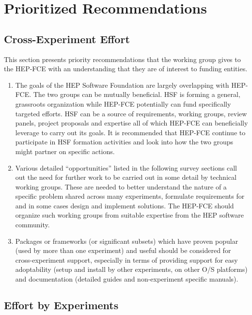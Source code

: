 \section{Prioritized Recommendations}

\subsection{Cross-Experiment Effort}

This section presents priority recommendations that the working group
gives to the HEP-FCE with an understanding that they are of interest
to funding entities.

\begin{enumerate}
\item The goals of the HEP Software Foundation are
  largely overlapping with HEP-FCE.  The two groups can be mutually
  beneficial.  HSF is forming a general, grassroots organization while
  HEP-FCE potentially can fund specifically targeted efforts.  HSF can
  be a source of requirements, working groups, review panels, project
  proposals and expertise all of which HEP-FCE can beneficially
  leverage to carry out its goals.  It is recommended that HEP-FCE
  continue to participate in HSF formation activities and look into
  how the two groups might partner on specific actions.

\item Various detailed ``opportunities'' listed in the following
  survey sections call out the need for further work to be carried out
  in some detail by technical working groups. These are needed to
  better understand the nature of a specific problem shared across
  many experiments, formulate requirements for and in some cases
  design and implement solutions.  The HEP-FCE should organize such
  working groups from suitable expertise from the HEP software community.

\item Packages or frameworks (or significant subsets) which have proven 
popular (used by more than one experiment) and useful should be considered for
cross-experiment support, especially in terms of providing support for
easy adoptability (setup and install by other experiments, on other 
O/S platforms) and documentation (detailed guides and non-experiment
specific manuals).

\end{enumerate}


\subsection{Effort by Experiments}

